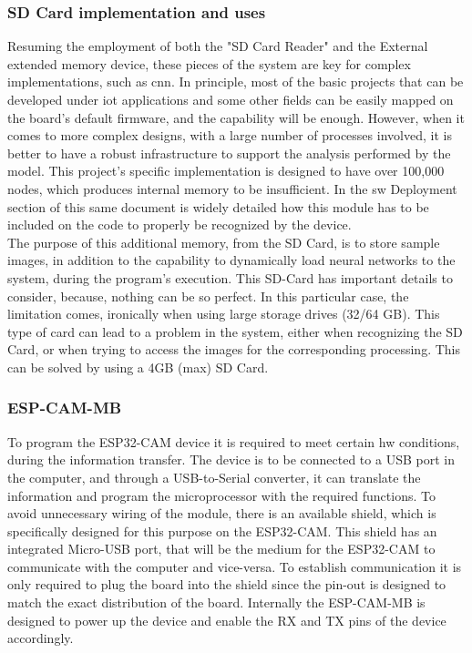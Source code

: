 \bigskip

\subsubsection{SD Card implementation and uses}
Resuming the employment of both the "SD Card Reader" and the External extended memory device, these pieces of the system are key for complex implementations, such as \ac{cnn}. In principle, most of the basic projects that can be developed under \ac{iot} applications and some other fields can be easily mapped on the board's default firmware, and the capability will be enough. However, when it comes to more complex designs, with a large number of processes involved, it is better to have a robust infrastructure to support the analysis performed by the model. This project's specific implementation is designed to have over 100,000 nodes, which produces internal memory to be insufficient. In the \ac{sw} Deployment section of this same document is widely detailed how this module has to be included on the code to properly be recognized by the device. \\

The purpose of this additional memory, from the SD Card, is to store sample images, in addition to the capability to dynamically load neural networks to the system, during the program's execution. \autocite{Kontis:2017} This SD-Card has important details to consider, because, nothing can be so perfect. In this particular case, the limitation comes, ironically when using large storage drives (32/64 GB). This type of card can lead to a problem in the system, either when recognizing the SD Card, or when trying to access the images for the corresponding processing. This can be solved by using a 4GB (max) SD Card. \\

\subsubsection{ESP-CAM-MB}
To program the ESP32-CAM device it is required to meet certain \ac{hw} conditions, during the information transfer. 
The device is to be connected to a USB port in the computer, and through a USB-to-Serial converter, it can translate the information and program the microprocessor with the required functions. To avoid unnecessary wiring of the module, there is an available shield, which is specifically designed for this purpose on the ESP32-CAM. This shield has an integrated Micro-USB port, that will be the medium for the ESP32-CAM to communicate with the computer and vice-versa. To establish communication it is only required to plug the board into the shield since the pin-out is designed to match the exact distribution of the board. Internally the ESP-CAM-MB is designed to power up the device and enable the RX and TX pins of the device accordingly. \\

